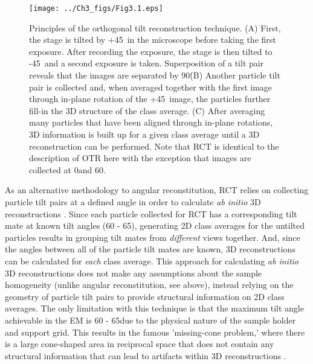 \begin{figure}
\centering
\texttt{[image: ../Ch3\_figs/Fig3.1.eps]}
\caption[Principles of the orthogonal tilt reconstruction technique]{Principles of the orthogonal tilt reconstruction technique. (A) First, the stage is tilted by +45\textdegree\ in the microscope before taking the first exposure. After recording the exposure, the stage is then tilted to -45\textdegree\ and a second exposure is taken. Superposition of a tilt pair reveals that the images are separated by 90\textdegree\. (B) Another particle tilt pair is collected and, when averaged together with the first image through in-plane rotation of the +45\textdegree\ image, the particles further fill-in the 3D structure of the class average.  (C) After averaging many particles that have been aligned through in-plane rotations, 3D information is built up for a given class average until a 3D reconstruction can be performed. Note that RCT is identical to the description of OTR here with the exception that images are collected at 0\textdegree and 60\textdegree.}    
\label{fig:Fig3.1}
\end{figure}
\indent As an alternative methodology to angular reconstitution, RCT relies on collecting particle tilt pairs at a defined angle in order to calculate \emph{ab initio} 3D reconstructions \cite{Radermacher_1987}. Since each particle collected for RCT has a corresponding tilt mate at known tilt angles (60 - 65\textdegree), generating 2D class averages for the untilted particles results in grouping tilt mates from \emph{different} views together. And, since the angles between all of the particle tilt mates are known, 3D reconstructions can be calculated for \emph{each} class average. This approach for calculating \emph{ab initio} 3D reconstructions does not make any assumptions about the sample homogeneity (unlike angular reconstitution, see above), instead relying on the geometry of particle tilt pairs to provide structural information on 2D class averages. The only limitation with this technique is that the maximum tilt angle achievable in the EM is 60 - 65\textdegree due to the physical nature of the sample holder and support grid. This results in the famous 'missing-cone problem,' where there is a large cone-shaped area in reciprocal space that does not contain any structural information that can lead to artifacts within 3D reconstructions \cite{Frank_1996}.\\ 
